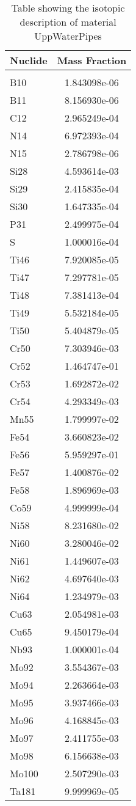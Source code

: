 \begin{centering}
\begin{table}[ht!]
\begin{tabular}{l | c}
\hline
Nuclide & Mass Fraction\\
\hline
\\
B10 & 1.843098e-06\\
B11 & 8.156930e-06\\
C12 & 2.965249e-04\\
N14 & 6.972393e-04\\
N15 & 2.786798e-06\\
Si28 & 4.593614e-03\\
Si29 & 2.415835e-04\\
Si30 & 1.647335e-04\\
P31 & 2.499975e-04\\
S & 1.000016e-04\\
Ti46 & 7.920085e-05\\
Ti47 & 7.297781e-05\\
Ti48 & 7.381413e-04\\
Ti49 & 5.532184e-05\\
Ti50 & 5.404879e-05\\
Cr50 & 7.303946e-03\\
Cr52 & 1.464747e-01\\
Cr53 & 1.692872e-02\\
Cr54 & 4.293349e-03\\
Mn55 & 1.799997e-02\\
Fe54 & 3.660823e-02\\
Fe56 & 5.959297e-01\\
Fe57 & 1.400876e-02\\
Fe58 & 1.896969e-03\\
Co59 & 4.999999e-04\\
Ni58 & 8.231680e-02\\
Ni60 & 3.280046e-02\\
Ni61 & 1.449607e-03\\
Ni62 & 4.697640e-03\\
Ni64 & 1.234979e-03\\
Cu63 & 2.054981e-03\\
Cu65 & 9.450179e-04\\
Nb93 & 1.000001e-04\\
Mo92 & 3.554367e-03\\
Mo94 & 2.263664e-03\\
Mo95 & 3.937466e-03\\
Mo96 & 4.168845e-03\\
Mo97 & 2.411755e-03\\
Mo98 & 6.156638e-03\\
Mo100 & 2.507290e-03\\
Ta181 & 9.999969e-05
\end{tabular}
\caption{Table showing the isotopic description of material UppWaterPipes}
\label{table:material_UppWaterPipes}
\end{table}\clearpage


\end{centering}
